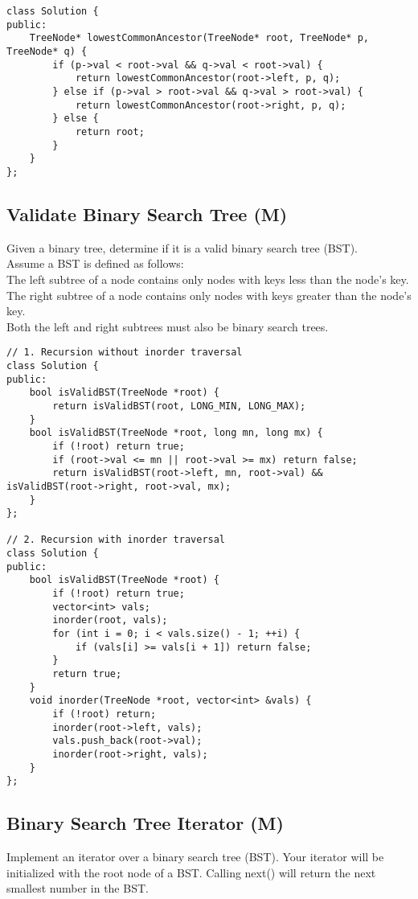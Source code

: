 \begin{lstlisting}
class Solution {
public:
    TreeNode* lowestCommonAncestor(TreeNode* root, TreeNode* p, TreeNode* q) {
        if (p->val < root->val && q->val < root->val) {
            return lowestCommonAncestor(root->left, p, q);
        } else if (p->val > root->val && q->val > root->val) {
            return lowestCommonAncestor(root->right, p, q);
        } else {
            return root;
        }     
    }
};
\end{lstlisting}


\subsection{Validate Binary Search Tree (M)}
Given a binary tree, determine if it is a valid binary search tree (BST).\\

Assume a BST is defined as follows:\\
    The left subtree of a node contains only nodes with keys less than the node's key.\\
    The right subtree of a node contains only nodes with keys greater than the node's key.\\
    Both the left and right subtrees must also be binary search trees.\\

\begin{lstlisting}
// 1. Recursion without inorder traversal
class Solution {
public:
    bool isValidBST(TreeNode *root) {
        return isValidBST(root, LONG_MIN, LONG_MAX);
    }
    bool isValidBST(TreeNode *root, long mn, long mx) {
        if (!root) return true;
        if (root->val <= mn || root->val >= mx) return false;
        return isValidBST(root->left, mn, root->val) && isValidBST(root->right, root->val, mx);
    }
};

// 2. Recursion with inorder traversal
class Solution {
public:
    bool isValidBST(TreeNode *root) {
        if (!root) return true;
        vector<int> vals;
        inorder(root, vals);
        for (int i = 0; i < vals.size() - 1; ++i) {
            if (vals[i] >= vals[i + 1]) return false;
        }
        return true;
    }
    void inorder(TreeNode *root, vector<int> &vals) {
        if (!root) return;
        inorder(root->left, vals);
        vals.push_back(root->val);
        inorder(root->right, vals);
    }
};
\end{lstlisting}


\subsection{Binary Search Tree Iterator (M)}
Implement an iterator over a binary search tree (BST). Your iterator will be initialized with the root node of a BST. Calling next() will return the next smallest number in the BST.\\

